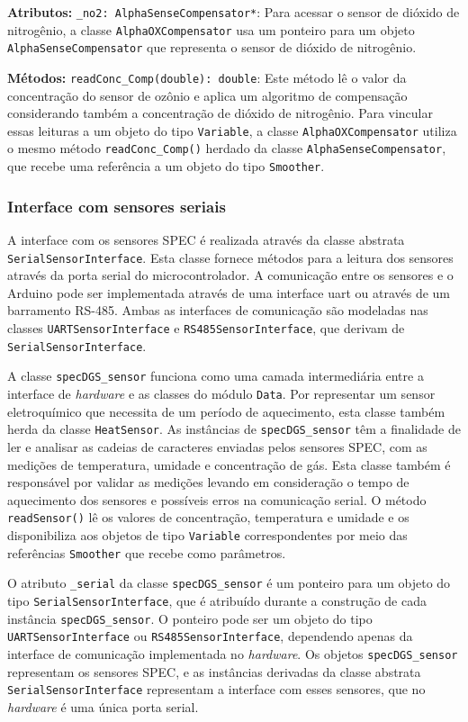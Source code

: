 \textbf{Atributos:}
\texttt{\_no2: AlphaSenseCompensator*}: Para acessar o sensor de dióxido de nitrogênio, a classe \texttt{AlphaOXCompensator} usa um ponteiro para um objeto \texttt{AlphaSenseCompensator} que representa o sensor de dióxido de nitrogênio.

\textbf{Métodos:}
\texttt{readConc\_Comp(double): double}: Este método lê o valor da concentração do sensor de ozônio e aplica um algoritmo de compensação considerando também a concentração de dióxido de nitrogênio. Para vincular essas leituras a um objeto do tipo \texttt{Variable}, a classe \texttt{AlphaOXCompensator} utiliza o mesmo método \texttt{readConc\_Comp()} herdado da classe \texttt{AlphaSenseCompensator}, que recebe uma referência a um objeto do tipo \texttt{Smoother}.

\subsubsection{Interface com sensores seriais}

A interface com os sensores SPEC é realizada através da classe abstrata \texttt{SerialSensorInterface}. Esta classe fornece métodos para a leitura dos sensores através da porta serial do microcontrolador. A comunicação entre os sensores e o Arduino pode ser implementada através de uma interface \acrshort{uart} ou através de um barramento RS-485. Ambas as interfaces de comunicação são modeladas nas classes \texttt{UARTSensorInterface} e \texttt{RS485SensorInterface}, que derivam de \texttt{SerialSensorInterface}.

A classe \texttt{specDGS\_sensor} funciona como uma camada intermediária entre a interface de \textit{hardware} e as classes do módulo \texttt{Data}. Por representar um sensor eletroquímico que necessita de um período de aquecimento, esta classe também herda da classe \texttt{HeatSensor}. As instâncias de \texttt{specDGS\_sensor} têm a finalidade de ler e analisar as cadeias de caracteres enviadas pelos sensores SPEC, com as medições de temperatura, umidade e concentração de gás. Esta classe também é responsável por validar as medições levando em consideração o tempo de aquecimento dos sensores e possíveis erros na comunicação serial. O método \texttt{readSensor()} lê os valores de concentração, temperatura e umidade e os disponibiliza aos objetos de tipo \texttt{Variable} correspondentes por meio das referências \texttt{Smoother} que recebe como parâmetros.

O atributo \texttt{\_serial} da classe \texttt{specDGS\_sensor} é um ponteiro para um objeto do tipo \texttt{SerialSensorInterface}, que é atribuído durante a construção de cada instância \texttt{specDGS\_sensor}. O ponteiro pode ser um objeto do tipo \texttt{UARTSensorInterface} ou \texttt{RS485SensorInterface}, dependendo apenas da interface de comunicação implementada no \textit{hardware}. Os objetos \texttt{specDGS\_sensor} representam os sensores SPEC, e as instâncias derivadas da classe abstrata \texttt{SerialSensorInterface} representam a interface com esses sensores, que no \textit{hardware} é uma única porta serial.

